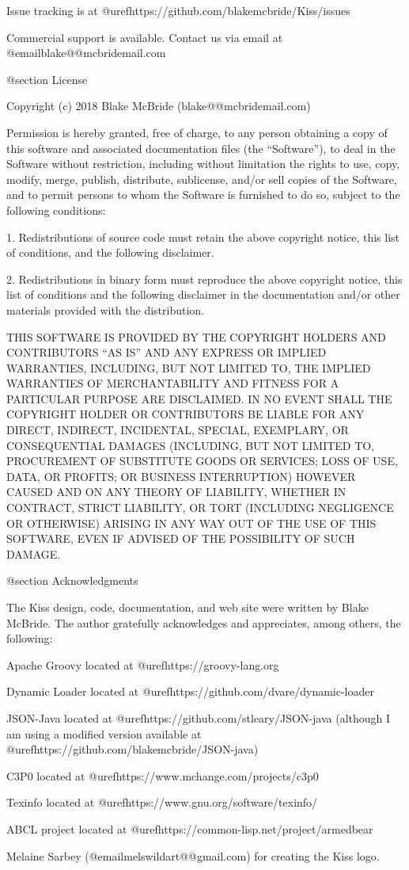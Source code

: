 Issue tracking is at @uref{https://github.com/blakemcbride/Kiss/issues}

Commercial support is available.  Contact us via email at @email{blake@@mcbridemail.com}

@section License

Copyright (c) 2018 Blake McBride (blake@@mcbridemail.com)

Permission is hereby granted, free of charge, to any person obtaining
a copy of this software and associated documentation files (the
``Software''), to deal in the Software without restriction, including
without limitation the rights to use, copy, modify, merge, publish,
distribute, sublicense, and/or sell copies of the Software, and to
permit persons to whom the Software is furnished to do so, subject to
the following conditions:

1. Redistributions of source code must retain the above copyright
notice, this list of conditions, and the following disclaimer.

2. Redistributions in binary form must reproduce the above copyright
notice, this list of conditions and the following disclaimer in the
documentation and/or other materials provided with the distribution.

THIS SOFTWARE IS PROVIDED BY THE COPYRIGHT HOLDERS AND CONTRIBUTORS
``AS IS'' AND ANY EXPRESS OR IMPLIED WARRANTIES, INCLUDING, BUT NOT
LIMITED TO, THE IMPLIED WARRANTIES OF MERCHANTABILITY AND FITNESS FOR
A PARTICULAR PURPOSE ARE DISCLAIMED. IN NO EVENT SHALL THE COPYRIGHT
HOLDER OR CONTRIBUTORS BE LIABLE FOR ANY DIRECT, INDIRECT, INCIDENTAL,
SPECIAL, EXEMPLARY, OR CONSEQUENTIAL DAMAGES (INCLUDING, BUT NOT
LIMITED TO, PROCUREMENT OF SUBSTITUTE GOODS OR SERVICES; LOSS OF USE,
DATA, OR PROFITS; OR BUSINESS INTERRUPTION) HOWEVER CAUSED AND ON ANY
THEORY OF LIABILITY, WHETHER IN CONTRACT, STRICT LIABILITY, OR TORT
(INCLUDING NEGLIGENCE OR OTHERWISE) ARISING IN ANY WAY OUT OF THE USE
OF THIS SOFTWARE, EVEN IF ADVISED OF THE POSSIBILITY OF SUCH DAMAGE.

@section Acknowledgments

The Kiss design, code, documentation, and web site were written by
Blake McBride.  The author gratefully acknowledges and appreciates,
among others, the following:


Apache Groovy located at @uref{https://groovy-lang.org}

Dynamic Loader located at @uref{https://github.com/dvare/dynamic-loader}

JSON-Java located at @uref{https://github.com/stleary/JSON-java}
(although I am using a modified version available at
@uref{https://github.com/blakemcbride/JSON-java})

C3P0 located at @uref{https://www.mchange.com/projects/c3p0}

Texinfo located at @uref{https://www.gnu.org/software/texinfo/}

ABCL project located at @uref{https://common-lisp.net/project/armedbear}

Melaine Sarbey (@email{melswildart@@gmail.com}) for creating the Kiss logo.

